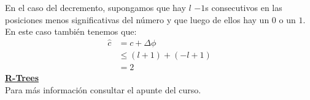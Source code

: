 \documentclass[dcc,uchile]{fcfmcourse}
\theoremstyle{plain}
\theoremstyle{definition}
\begin{document}
\begin{problems}
En el caso del decremento, supongamos que hay  $l$ $-1$s consecutivos en las posiciones menos significativas del número y que luego de ellos hay un $0$ o un $1$. En este caso también tenemos que:
\begin{align*}
    \hat{c} &= c + \Delta \phi \\
    &\le (l+1) + (-l + 1)\\
    &= 2
\end{align*}
\problem \underline{\textbf{R-Trees}}\\
Para más información consultar el apunte del curso.
\end{problems}
\end{document}
